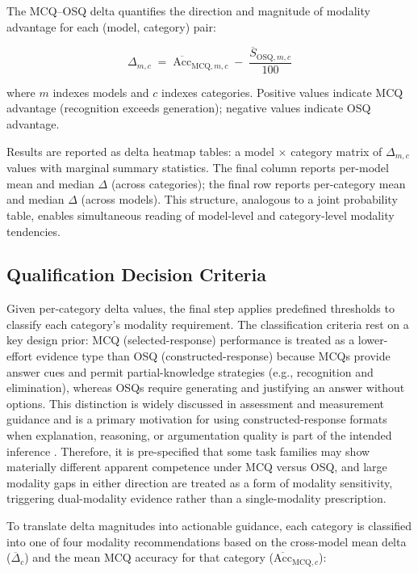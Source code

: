 The MCQ--OSQ delta quantifies the direction and magnitude of modality advantage for each (model, category) pair:

\[
\Delta_{m,c} \;=\; \overline{\text{Acc}}_{\text{MCQ},m,c} \;-\; \frac{\overline{S}_{\text{OSQ},m,c}}{100}
\]

where $m$ indexes models and $c$ indexes categories. Positive values indicate MCQ advantage (recognition exceeds generation); negative values indicate OSQ advantage.

Results are reported as delta heatmap tables: a model $\times$ category matrix of $\Delta_{m,c}$ values with marginal summary statistics. The final column reports per-model mean and median $\Delta$ (across categories); the final row reports per-category mean and median $\Delta$ (across models). This structure, analogous to a joint probability table, enables simultaneous reading of model-level and category-level modality tendencies.


\subsection{Qualification Decision Criteria}
\label{subsec:ch3_obj7_delta}

Given per-category delta values, the final step applies predefined thresholds to classify each category's modality requirement. The classification criteria rest on a key design prior: MCQ (selected-response) performance is treated as a lower-effort evidence type than OSQ (constructed-response) because MCQs provide answer cues and permit partial-knowledge strategies (e.g., recognition and elimination), whereas OSQs require generating and justifying an answer without options. This distinction is widely discussed in assessment and measurement guidance and is a primary motivation for using constructed-response formats when explanation, reasoning, or argumentation quality is part of the intended inference \cite{livingston_ConstructedResponseTestQuestionsWhy_2009, AmEdAssoc_StandardsForEducationalTesting_2014}. Therefore, it is pre-specified that some task families may show materially different apparent competence under MCQ versus OSQ, and large modality gaps in either direction are treated as a form of modality sensitivity, triggering dual-modality evidence rather than a single-modality prescription.

To translate delta magnitudes into actionable guidance, each category is classified into one of four modality recommendations based on the cross-model mean delta ($\overline{\Delta}_c$) and the mean MCQ accuracy for that category ($\overline{\text{Acc}}_{\text{MCQ},c}$):

